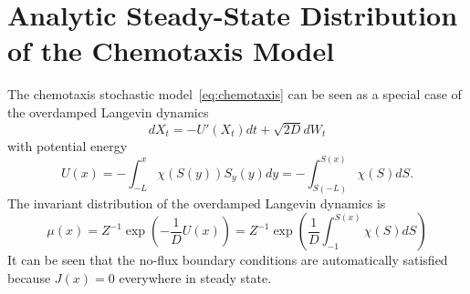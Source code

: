 \documentclass{article}
\begin{document}
\section{Analytic Steady-State Distribution of the Chemotaxis Model} \label{app:chemotaxis}
The chemotaxis stochastic model~\eqref{eq:chemotaxis} can be seen as a special case of the overdamped Langevin dynamics
\begin{equation}
    dX_t = -U'(X_t) dt + \sqrt{2 D} dW_t
\end{equation}
with potential energy 
\begin{equation*}
U(x) = -\int_{-L}^x \chi(S(y)) S_y(y) dy = -\int_{S(-L)}^{S(x)} \chi(S)dS.
\end{equation*}
The invariant distribution of the overdamped Langevin dynamics is
\begin{equation*}
    \mu(x) = Z^{-1} \exp\left(-\frac{1}{D} U(x)\right) = Z^{-1} \exp\left(\frac{1}{D} \int_{-1}^{S(x)} \chi(S)dS\right)
\end{equation*}
It can be seen that the no-flux boundary conditions are automatically satisfied because $J(x) = 0$ everywhere in steady state.


\end{document}
